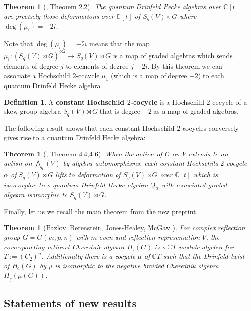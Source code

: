 \documentclass[10pt]{article}
\newcommand{\nt}{\noindent}
\newcommand{\Cc }{\mathbb{C}}
\newcommand{\rt}{\xrightarrow{}}
\newcommand{\define}[1]{\textbf{#1}\index{#1}}
\newtheorem{theorem}[lemma]{Theorem}
\theoremstyle{definition}
\newtheorem{definition}[lemma]{Definition}
\begin{document}
\begin{theorem}[\cite{2011arXiv11115243N}, Theorem 2.2] The quantum Drinfeld Hecke algebras over $\Cc [t]$ are precisely those deformations over $\Cc [t]$ of $S_q(V)\rtimes G$ where $\deg(\mu_i)=-2i$.
\end{theorem}

\nt Note that $\deg(\mu_i)=-2i$ means that the map $\mu_i:(S_q(V)\rtimes G)^{\otimes 2}\rt S_q(V)\rtimes G$ is a map of graded algebras which sends elements of degree $j$ to elements of degree $j-2i$. By this theorem we can associate a Hochschild $2$-cocycle $\mu_1$ (which is a map of degree $-2$) to each quantum Drinfeld Hecke algebra.
\begin{definition}\label{constant} \cite{2011arXiv11115243N}
A \define{constant Hochschild $2$-cocycle} is a Hochschild $2$-cocycle of a skew group algebra $S_q(V)\rtimes G$ that is degree $-2$ as a map of graded algebras.
\end{definition}

\nt The following result shows that each constant Hochschild $2$-cocycles conversely gives rise to a quantum Drinfeld Hecke algebra:
\begin{theorem}[\cite{2011arXiv11115243N}, Theorem 4.4,4.6]\label{quantum_dh_alg} When the action of $G$ on $V$ extends to an action on $\bigwedge_q(V)$ by algebra automorphisms, each constant Hochschild $2$-cocycle $\alpha$ of $S_q(V)\rtimes G$ lifts to deformation of $S_q(V)\rtimes G$ over $\Cc [t]$ which is isomorphic to a quantum Drinfeld Hecke algebra $Q_\alpha$ with associated graded algebra isomorphic to $S_q(V)\rtimes G$.
\end{theorem}

\nt Finally, let us we recall the main theorem from the new preprint.

\begin{theorem}[Bazlov, Berenstein, Jones-Healey, McGaw \cite{twistsrcas}]\label{our_theorem} For complex reflection group $G=G(m,p,n)$ with $m$ even and reflection representation $V$, the corresponding rational Cherednik algebra $H_{c}(G)$ is a $\Cc  T$-module algebra for $T:=(C_2)^n$. Additionally there is a cocycle $\mu$ of $\Cc  T$ such that the Drinfeld twist of $H_c(G)$ by $\mu$ is isomorphic to the negative braided Cherednik algebra $\underline{H}_{\underline{c}}(\mu(G))$.
\end{theorem}

\subsection{Statements of new results}\label{new_results_sec}
\end{document}
